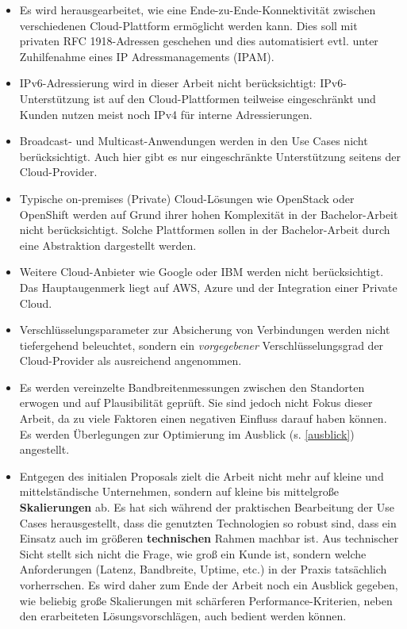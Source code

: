 \begin{itemize}
\item Es wird herausgearbeitet, wie eine Ende-zu-Ende-Konnektivität zwischen verschiedenen Cloud-Plattform ermöglicht werden kann. Dies soll mit privaten \gls{RFC} 1918-Adressen geschehen und dies automatisiert evtl. unter Zuhilfenahme eines IP Adressmanagements (IPAM).
\item IPv6-Adressierung wird in dieser Arbeit nicht berücksichtigt: IPv6-Unterstützung ist auf den Cloud-Plattformen teilweise eingeschränkt und Kunden nutzen meist noch IPv4 für interne Adressierungen\cite{azureipv6_2020}.
\item Broadcast- und Multicast-Anwendungen werden in den Use Cases nicht berücksichtigt. Auch hier gibt es nur eingeschränkte Unterstützung seitens der Cloud-Provider.
\item Typische \gls{on-premises} (Private) Cloud-Lösungen wie OpenStack oder OpenShift werden auf Grund ihrer hohen Komplexität in der Bachelor-Arbeit nicht berücksichtigt. Solche Plattformen sollen in der Bachelor-Arbeit durch eine Abstraktion dargestellt werden.
\item Weitere Cloud-Anbieter wie Google oder IBM werden nicht berücksichtigt. Das Hauptaugenmerk liegt auf AWS, Azure und der Integration einer Private Cloud.
\item Verschlüsselungsparameter zur Absicherung von Verbindungen werden nicht tiefergehend beleuchtet, sondern ein \textit{vorgegebener} Verschlüsselungsgrad der Cloud-Provider als ausreichend angenommen.
\item Es werden vereinzelte Bandbreitenmessungen zwischen den Standorten erwogen und auf Plausibilität geprüft. Sie sind jedoch nicht Fokus dieser Arbeit, da zu viele Faktoren einen negativen Einfluss darauf haben können. Es werden Überlegungen zur Optimierung im Ausblick (s. \ref{ausblick}) angestellt.
\item Entgegen des initialen Proposals zielt die Arbeit nicht mehr auf kleine und mittelständische Unternehmen, sondern auf kleine bis mittelgroße \textbf{Skalierungen} ab. Es hat sich während der praktischen Bearbeitung der Use Cases herausgestellt, dass die genutzten Technologien so robust sind, dass ein Einsatz auch im \glqq größeren \textbf{technischen} Rahmen\grqq{} machbar ist. Aus technischer Sicht stellt sich nicht die Frage, wie \glqq groß\grqq{} ein Kunde ist, sondern welche Anforderungen (Latenz, Bandbreite, Uptime, etc.) in der Praxis tatsächlich vorherrschen. Es wird daher zum Ende der Arbeit noch ein Ausblick gegeben, wie beliebig große Skalierungen mit schärferen Performance-Kriterien, neben den erarbeiteten Lösungsvorschlägen, auch bedient werden können.
\end{itemize}

